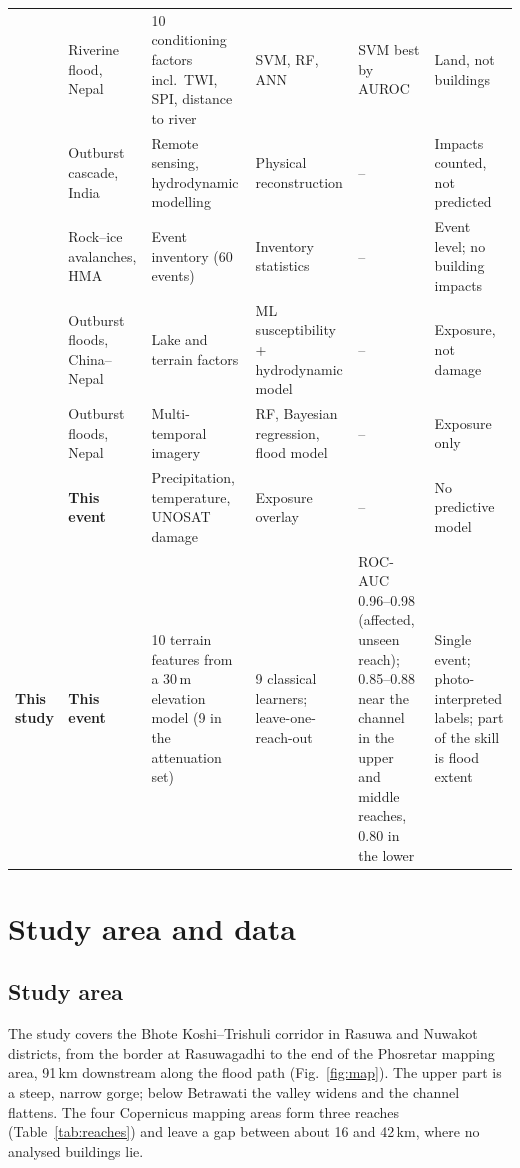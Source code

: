 \documentclass[journal,a4paper]{IEEEtran}
\begin{document}
\begin{table}[tp]
\begin{tabularx}{\textwidth}{@{}L{2.3cm}L{2.2cm}L{3.6cm}L{2.7cm}L{2.6cm}Y@{}}
\citet{duwal2023} & Riverine flood, Nepal & 10 conditioning factors incl.\ TWI, SPI, distance to river & SVM, RF, ANN & SVM best by AUROC & Land, not buildings\\
\citet{sattar2025} & Outburst cascade, India & Remote sensing, hydrodynamic modelling & Physical reconstruction & -- & Impacts counted, not predicted\\
\citet{zhong2024} & Rock--ice avalanches, HMA & Event inventory (60 events) & Inventory statistics & -- & Event level; no building impacts\\
\citet{gouli2025} & Outburst floods, China--Nepal & Lake and terrain factors & ML susceptibility + hydrodynamic model & -- & Exposure, not damage\\
\citet{chen2025} & Outburst floods, Nepal & Multi-temporal imagery & RF, Bayesian regression, flood model & -- & Exposure only\\
\citet{li2026} & \textbf{This event} & Precipitation, temperature, UNOSAT damage & Exposure overlay & -- & No predictive model\\
\midrule
\textbf{This study} & \textbf{This event} & 10 terrain features from a 30\,m elevation model (9 in the attenuation set) & 9 classical learners; leave-one-reach-out & ROC-AUC 0.96--0.98 (affected, unseen reach); 0.85--0.88 near the channel in the upper and middle reaches, 0.80 in the lower & Single event; photo-interpreted labels; part of the skill is flood extent\\
\bottomrule
\end{tabularx}
\end{table}

\section{Study area and data}\label{sec:data}

\subsection{Study area}
The study covers the Bhote Koshi--Trishuli corridor in Rasuwa and Nuwakot districts, from the border at Rasuwagadhi to the end of the Phosretar mapping area, 91\,km downstream along the flood path (Fig.~\ref{fig:map}). The upper part is a steep, narrow gorge; below Betrawati the valley widens and the channel flattens. The four Copernicus mapping areas form three reaches (Table~\ref{tab:reaches}) and leave a gap between about 16 and 42\,km, where no analysed buildings lie.
\end{document}

